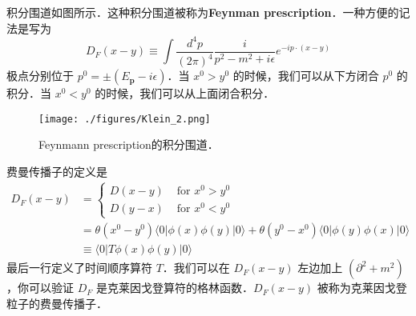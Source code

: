 积分围道如图所示．这种积分围道被称为\textbf{Feynman prescription}．一种方便的记法是写为
\begin{equation}
D_F(x-y) \equiv \int \frac{d^4p}{(2\pi)^4} \frac{i}{p^2-m^2+i\epsilon} e^{-ip\cdot(x-y)}
\end{equation}
极点分别位于 $p^0 = \pm(E_{\mathbf p}-i\epsilon)$．当 $x^0>y^0$ 的时候，我们可以从下方闭合 $p^0$ 的积分．当 $x^0<y^0$ 的时候，我们可以从上面闭合积分．
\begin{figure}[ht]
\centering
\texttt{[image: ./figures/Klein\_2.png]}
\caption{Feynmann prescription的积分围道．} \label{Klein_fig2}
\end{figure}
费曼传播子的定义是
\begin{equation}
\begin{aligned}
D_{F}(x-y) &= \begin{cases}D(x-y) & \text { for } x^{0}>y^{0} \\
D(y-x) & \text { for } x^{0}<y^{0}\end{cases} \\
&=\theta\left(x^{0}-y^{0}\right)\langle 0|\phi(x) \phi(y)| 0\rangle+\theta\left(y^{0}-x^{0}\right)\langle 0|\phi(y) \phi(x)| 0\rangle \\
& \equiv\langle 0|T \phi(x) \phi(y)| 0\rangle
\end{aligned}
\end{equation}
最后一行定义了时间顺序算符 $T$．我们可以在 $D_F(x-y)$ 左边加上 $(\partial^2+m^2)$，你可以验证 $D_F$ 是克莱因戈登算符的格林函数．$D_F(x-y)$ 被称为克莱因戈登粒子的费曼传播子．

